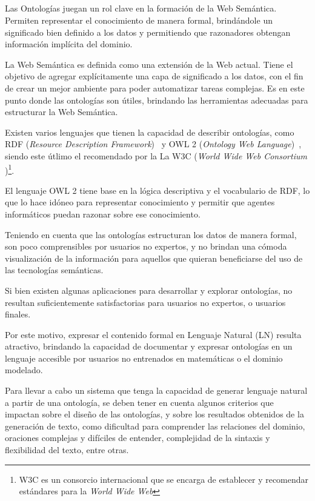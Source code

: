 \ \\
\ \\
\label{pagresum}
\\ \\
Las Ontologías juegan un rol clave en la formación de la Web Semántica. Permiten representar el conocimiento de manera formal, brindándole un significado bien definido a los datos y permitiendo que razonadores obtengan información implícita del dominio. 

La Web Semántica es definida como una extensión de la Web actual. Tiene el objetivo de agregar explícitamente una capa de significado a los datos, con el fin de crear un mejor ambiente para poder automatizar tareas complejas. Es en este punto donde las ontologías son útiles, brindando las herramientas adecuadas para estructurar la Web Semántica. 

Existen varios lenguajes que tienen la capacidad de describir ontologías, como RDF (\emph{Resource Description Framework})~\cite{RDFRecomendW3C} y OWL 2 (\emph{Ontology Web Language})~\cite{RecomendW3C}, siendo este útlimo el recomendado por la La W3C (\emph{World Wide Web Consortium })\footnote{W3C es un consorcio internacional que se encarga de establecer y recomendar estándares para la \emph{World Wide Web}}.

El lenguaje OWL 2 tiene base en la lógica descriptiva y el vocabulario de RDF, lo que lo hace idóneo para representar conocimiento y permitir que agentes informáticos puedan razonar sobre ese conocimiento.

Teniendo en cuenta que las ontologías estructuran los datos de manera formal, son poco comprensibles por usuarios no expertos, y no brindan una cómoda visualización de la información para aquellos que quieran beneficiarse del uso de las tecnologías semánticas.

Si bien existen algunas aplicaciones para  desarrollar y explorar ontologías, no resultan suficientemente satisfactorias para usuarios no expertos, o usuarios finales. 

Por este motivo, expresar el contenido formal en Lenguaje Natural (LN) resulta atractivo, brindando la capacidad de documentar y expresar ontologías en un lenguaje accesible por usuarios no entrenados en matemáticas o el dominio modelado. 

Para llevar a cabo un sistema que tenga la capacidad de generar lenguaje natural a partir de una ontología, se deben tener en cuenta algunos criterios que impactan sobre el diseño de las ontologías, y sobre los resultados obtenidos de la generación de texto, como dificultad para comprender las relaciones del dominio, oraciones complejas y difíciles de entender, complejidad de la sintaxis y flexibilidad del texto, entre otras. 

